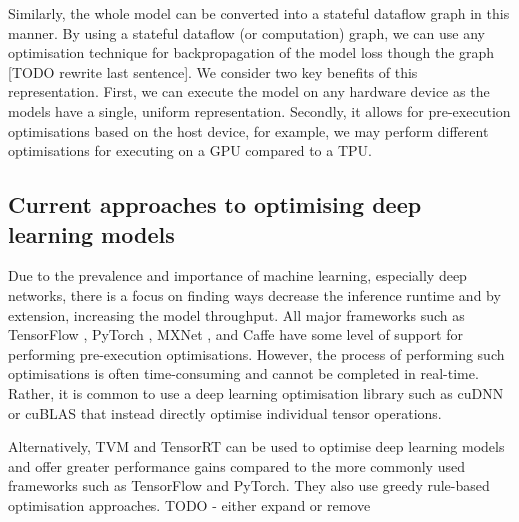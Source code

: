 Similarly, the whole model can be converted into a stateful dataflow graph in this manner. By using a stateful dataflow (or computation) graph, we can use any optimisation technique for backpropagation of the model loss though the graph [TODO rewrite last sentence]. We consider two key benefits of this representation. First, we can execute the model on any hardware device as the models have a single, uniform representation. Secondly, it allows for pre-execution optimisations based on the host device, for example, we may perform different optimisations for executing on a GPU compared to a TPU.

\subsection{Current approaches to optimising deep learning models}
\label{sec:bg:subsec:currentapp}

Due to the prevalence and importance of machine learning, especially deep networks, there is a focus on finding ways decrease the inference runtime and by extension, increasing the model throughput. All major frameworks such as TensorFlow \cite{tensorflow2015-whitepaper}, PyTorch \cite{pytorch}, MXNet \cite{chen2015mxnet}, and Caffe \cite{jia2014caffe} have some level of support for performing pre-execution optimisations. However, the process of performing such optimisations is often time-consuming and cannot be completed in real-time. Rather, it is common to use a deep learning optimisation library such as cuDNN \cite{chetlur2014cudnn} or cuBLAS \cite{cublas2008} that instead directly optimise individual tensor operations.



Alternatively, TVM \cite{chen2018tvm} and TensorRT \cite{tensorrt2017} can be used to optimise deep learning models and offer greater performance gains compared to the more commonly used frameworks such as TensorFlow and PyTorch. They also use greedy rule-based optimisation approaches. TODO - either expand or remove

